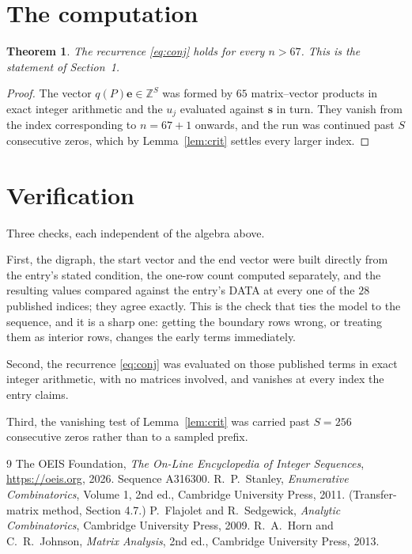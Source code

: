 \documentclass[11pt,a4paper]{article}
\theoremstyle{plain}
\newtheorem{theorem}{Theorem}
\theoremstyle{definition}
\begin{document}
\section{The computation}

\begin{theorem}
The recurrence \eqref{eq:conj} holds for every $n>67$. This is the statement of
Section~1.
\end{theorem}

\begin{proof}
The vector $q(P)\mathbf{e}\in\mathbb{Z}^{S}$ was formed by $65$ matrix--vector
products in exact integer arithmetic and the $u_j$ evaluated against $\mathbf{s}$ in turn.
They vanish from the index corresponding to $n=67+1$ onwards, and the run was continued
past $S$ consecutive zeros, which by Lemma~\ref{lem:crit} settles every larger index.
\end{proof}

\section{Verification}

Three checks, each independent of the algebra above.

First, the digraph, the start vector and the end vector were built directly from the
entry's stated condition, the one-row count computed separately, and the resulting values
compared against the entry's DATA at every one of the $28$ published indices; they
agree exactly. This is the check that ties the model to the sequence, and it is a sharp one:
getting the boundary rows wrong, or treating them as interior rows, changes the early terms
immediately.

Second, the recurrence \eqref{eq:conj} was evaluated on those published terms in exact
integer arithmetic, with no matrices involved, and vanishes at every index the entry claims.

Third, the vanishing test of Lemma~\ref{lem:crit} was carried past $S=256$ consecutive
zeros rather than to a sampled prefix.

\begin{thebibliography}{9}
 The OEIS Foundation, \emph{The On-Line Encyclopedia of Integer
Sequences}, \url{https://oeis.org}, 2026. Sequence A316300.
 R.~P.~Stanley, \emph{Enumerative Combinatorics}, Volume 1, 2nd ed.,
Cambridge University Press, 2011. (Transfer-matrix method, Section 4.7.)
 P.~Flajolet and R.~Sedgewick, \emph{Analytic Combinatorics}, Cambridge
University Press, 2009.
 R.~A.~Horn and C.~R.~Johnson, \emph{Matrix Analysis}, 2nd ed., Cambridge
University Press, 2013.
\end{thebibliography}
\end{document}
